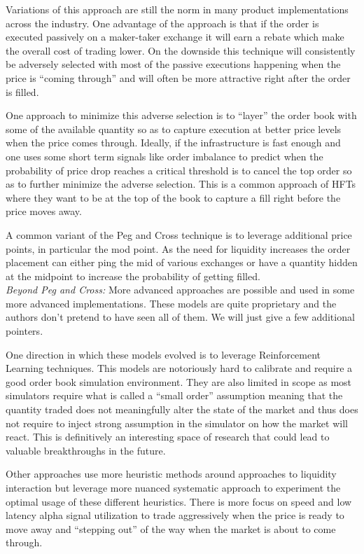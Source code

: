 Variations of this approach are still the norm in many product implementations across the industry. One advantage of the approach is that if  the order is executed passively on a maker-taker exchange it will earn a rebate which make the overall cost of trading lower. On the downside this technique will consistently be adversely selected with most of the passive executions happening when the price is ``coming through'' and will often be more attractive right after the order is filled.


One approach to minimize this adverse selection is to ``layer'' the order book with some of the available quantity so as to capture execution at better price levels when the price comes through. Ideally, if the infrastructure is fast enough and one uses some short term signals like order imbalance to predict when the probability of price drop reaches a critical threshold is to cancel the top order so as to further minimize the adverse selection. This is a common approach of HFTs where they want to be at the top of the book to capture a fill right before the price moves away.


A common variant of the Peg and Cross technique is to leverage additional price points, in particular the mod point. As the need for liquidity increases the order placement can either ping the mid of various exchanges or have a quantity hidden at the midpoint to increase the probability of getting filled. \\


\noindent\emph{Beyond Peg and Cross:} More advanced approaches are possible and used in some more advanced implementations. These models are quite proprietary and the authors don't pretend to have seen all of them. We will just give a few additional pointers.


One direction in which these models evolved is to leverage Reinforcement Learning techniques. This models are notoriously hard to calibrate and require a good order book simulation environment. They are also limited in scope as most simulators require what is called a ``small order'' assumption meaning that the quantity traded does not meaningfully alter the state of the market and thus does not require to inject strong assumption in the simulator on how the market will react. This is definitively an interesting space of research that could lead to valuable breakthroughs in the future.


Other approaches use more heuristic methods around approaches to liquidity interaction but leverage more nuanced systematic approach to experiment the optimal usage of these different heuristics. There is more focus on speed and low latency alpha  signal utilization to trade aggressively when the price is ready to move away and ``stepping out'' of the way when the market is about to come through.


